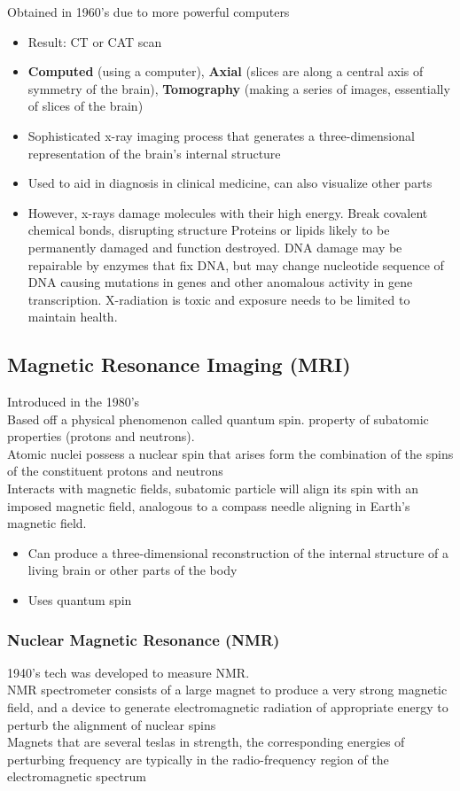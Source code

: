 \documentclass{article}
\begin{document}
Obtained in 1960's due to more powerful computers 
\begin{itemize}
    \item Result: CT or CAT scan
    \item \textbf{Computed} (using a computer), \textbf{Axial} (slices are along a central axis of symmetry of the brain), \textbf{Tomography} (making a series of images, essentially of slices of the brain)
    \item Sophisticated x-ray imaging process that generates a three-dimensional representation of the brain's internal structure
    \item Used to aid in diagnosis in clinical medicine, can also visualize other parts
    \item However, x-rays damage molecules with their high energy. 
        \subitem Break covalent chemical bonds, disrupting structure
        \subitem Proteins or lipids likely to be permanently damaged and function destroyed. 
        \subitem DNA damage may be repairable by enzymes that fix DNA, but may change nucleotide sequence of DNA causing mutations in genes and other anomalous activity in gene transcription.
        \subitem X-radiation is toxic and exposure needs to be limited to maintain health. 
\end{itemize}


\subsection{Magnetic Resonance Imaging (MRI)}
Introduced in the 1980's \\
Based off a physical phenomenon called quantum spin. property of subatomic properties (protons and neutrons). \\
Atomic nuclei possess a nuclear spin that arises form the combination of the spins of the constituent protons and neutrons \\
Interacts with magnetic fields, subatomic particle will align its spin with an imposed magnetic field, analogous to a compass needle aligning in Earth's magnetic field. 
\begin{itemize}
    \item Can produce a three-dimensional reconstruction of the internal structure of a living brain or other parts of the body
    \item Uses quantum spin
\end{itemize}

\subsubsection{Nuclear Magnetic Resonance (NMR)}
1940's tech was developed to measure NMR. \\
NMR spectrometer consists of a large magnet to produce a very strong magnetic field, and a device to generate electromagnetic radiation of appropriate energy to perturb the alignment of nuclear spins \\
Magnets that are several teslas in strength, the corresponding energies of perturbing frequency are typically in the radio-frequency region of the electromagnetic spectrum \\
\end{document}
